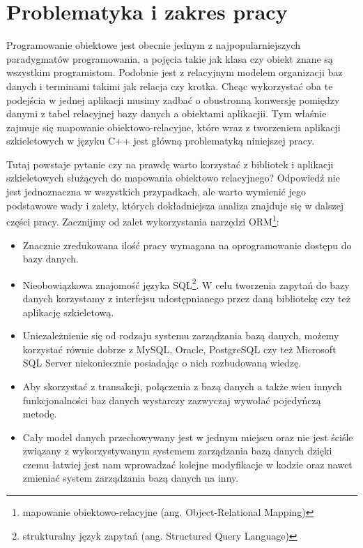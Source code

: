 \documentclass[12pt]{report}
\begin{document}
\section{Problematyka i zakres pracy}

Programowanie obiektowe jest obecnie jednym z najpopularniejszych pa\-ra\-dy\-gma\-tów programowania, a pojęcia takie jak klasa czy obiekt znane są wszystkim programistom.
Podobnie jest z relacyjnym modelem organizacji baz danych i terminami takimi jak relacja czy krotka. Chcąc wykorzystać oba te podejścia w jednej aplikacji musimy zadbać o 
obustronną konwersję pomiędzy danymi z tabel relacyjnej bazy danych a obiektami aplikacjii. Tym właśnie zajmuje się mapowanie obiektowo-relacyjne, które wraz z tworzeniem 
aplikacji szkieletowych w języku C++ jest główną problematyką niniejszej pracy.

Tutaj powstaje pytanie czy na prawdę warto korzystać z bibliotek i aplikacji szkieletowych służących do mapowania obiektowo relacyjnego? Od\-po\-wiedź nie jest
jednoznaczna w wszystkich przypadkach, ale warto wymienić jego podstawowe wady i zalety, których dokładniejsza analiza znajduje się w dalszej części pracy. Zacznijmy od zalet 
wykorzystania narzędzi ORM\footnote{mapowanie obiektowo-relacyjne (ang. Object-Relational Mapping)}:

\begin{itemize}
\item Znacznie zredukowana ilość pracy wymagana na oprogramowanie dostępu do bazy danych.
\item Nieobowiązkowa znajomość języka SQL\footnote{strukturalny język zapytań (ang. Structured Query Language)}. W celu tworzenia zapytań do bazy
danych korzystamy z interfejsu udostępnianego przez daną bibliotekę czy też aplikację szkieletową.
\item Uniezależnienie się od rodzaju systemu zarządzania bazą danych, możemy korzystać równie dobrze z MySQL, Oracle, PostgreSQL czy też Microsoft SQL Server
niekoniecznie posiadając o nich rozbudowaną wiedzę.
\item Aby skorzystać z transakcji, połączenia z bazą danych a także wieu innych funkcjonalności baz danych wystarczy zazwyczaj wywołać pojedyńczą me\-to\-dę.
\item Cały model danych przechowywany jest w jednym miejscu oraz nie jest ściśle związany z wykorzystywanym systemem zarządzania bazą danych dzięki cze\-mu łatwiej 
jest nam wprowadzać kolejne modyfikacje w kodzie oraz nawet zmieniać system zarządzania bazą danych na inny.
\end{itemize}
\end{document}
